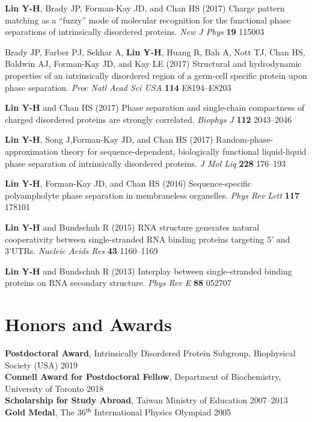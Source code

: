 \documentclass[11pt]{../yhlcv}
\def\tname#1{{\bf #1}}
\begin{document}
\begin{etaremune}[leftmargin=0.26in]
\item
\tname{Lin Y-H}, Brady JP, Forman-Kay JD, and Chan HS (2017) 
Charge pattern matching as a ``fuzzy'' mode of molecular recognition for the functional phase separations of intrinsically disordered proteins.
{\it New J Phys} {\bf 19} 115003

\item 
Brady JP, Farber PJ, Sekhar A, \tname{Lin Y-H}, Huang R, Bah A, Nott TJ, Chan HS, Baldwin AJ, Forman-Kay JD, and Kay LE (2017) 
Structural and hydrodynamic properties of an intrinsically disordered region of a germ-cell specific protein upon phase separation. 
{\it Proc Natl Acad Sci USA} {\bf 114} E8194--E8203

\item
\tname{Lin Y-H} and Chan HS (2017) 
Phase separation and single-chain compactness of charged disordered proteins are strongly correlated. 
{\it Biophys J} {\bf 112} 2043--2046

\item 
\tname{Lin Y-H}, Song J,Forman-Kay JD, and Chan HS  (2017) 
Random-phase-approximation theory for sequence-dependent, biologically functional liquid-liquid phase separation of intrinsically disordered proteins. 
{\it J Mol Liq} {\bf 228} 176--193

\item
\tname{Lin Y-H}, Forman-Kay JD, and Chan HS (2016) 
Sequence-specific polyampholyte phase separation in membraneless organelles. 
{\it Phys Rev Lett} {\bf 117} 178101

\item 
\tname{Lin Y-H} and Bundschuh R (2015) 
RNA structure generates natural cooperativity between single-stranded RNA binding proteins targeting 5' and 3'UTRs.
{\it Nucleic Acids Res} {\bf 43} 1160--1169

\item 
\tname{Lin Y-H} and Bundschuh R (2013) 
Interplay between single-stranded binding proteins on RNA secondary structure.
{\it Phys Rev E} {\bf 88} 052707

\end{etaremune} 

\section*{Honors and Awards}

\noindent
{\bf Postdoctoral Award}, Intrinsically Disordered Protein Subgroup, Biophysical Society (USA) \hfill 2019 \\
{\bf Connell Award for Postdoctoral Fellow}, Department of Biochemistry, University of Toronto \hfill 2018 \\
{\bf Scholarship for Study Abroad}, Taiwan Ministry of Education  \hfill 2007--2013 \\
{\bf Gold Medal}, The 36$^{ \mathsf{th}}$ International Physics Olympiad \hfill 2005
\end{document}
